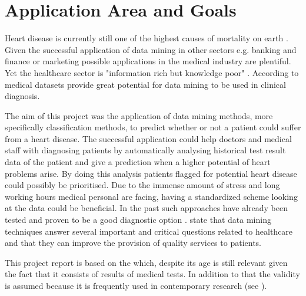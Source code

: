 \section{Application Area and Goals} \label{sec:applicationAreaGoals}

Heart disease is currently still one of the highest causes of mortality on earth \citep{nahar2013, kavitha2016, statistischesbundesamt2020}.
Given the successful application of data mining in other sectors e.g. banking and finance or marketing \citep{keles2017} possible applications in the medical industry are plentiful. Yet the healthcare sector is "information rich but knowledge poor" \citep{soni2011}. According to \citet{soni2011} medical datasets provide great potential for data mining to be used in clinical diagnosis.


The aim of this project was the application of data mining methods, more specifically classification methods, to predict whether or not a patient could suffer from a heart disease. The successful application could help doctors and medical staff with diagnosing patients by automatically analysing historical test result data of the patient and give a prediction when a higher potential of heart problems arise. By doing this analysis patients flagged for potential heart disease could possibly be prioritised. Due to the immense amount of stress and long working hours medical personal are facing, having a standardized scheme looking at the data could be beneficial. 
In the past such approaches have already been tested and proven to be a good diagnostic option \citep{usharani2011}. \citet{jabbar2013} state that data mining techniques answer several important and critical questions related to healthcare and that they can improve the provision of quality services to patients.

This project report is based on the  \citep{janosi1988} which, despite its age is still relevant given the fact that it consists of results of medical tests. In addition to that the validity is assumed because it is frequently used in contemporary research (see \cite{usharani2011, aha1988, nahar2013}).
